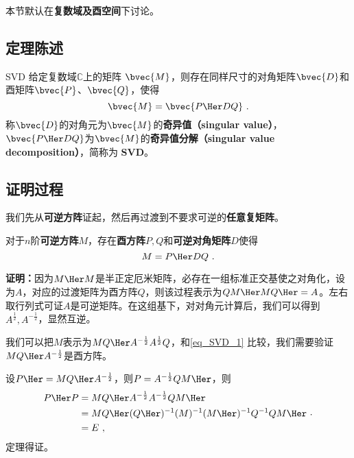 


本节默认在\textbf{复数域及酉空间}下讨论。
\subsection{定理陈述}
\begin{theorem}{SVD}
给定复数域$\mathbb{C}$上的矩阵 $\bvec{M}$，则存在同样尺寸的对角矩阵$\bvec{D}$和酉矩阵$\bvec{P}$、$\bvec{Q}$，使得
\begin{equation}
\bvec{M} = \bvec{P\Her DQ}~. 
\end{equation}
称$\bvec{D}$的对角元为$\bvec{M}$的\textbf{奇异值（singular value）}，$\bvec{P\Her DQ}$为$\bvec{M}$的\textbf{奇异值分解（singular value decomposition）}，简称为 \textbf{SVD}。
\end{theorem}


\subsection{证明过程}

我们先从\textbf{可逆方阵}证起，然后再过渡到不要求可逆的\textbf{任意复矩阵}。
\begin{theorem}{}\label{the_SVD_1}
对于$n$阶\textbf{可逆方阵}$M$，存在\textbf{酉方阵}$P,Q$和\textbf{可逆对角矩阵}$D$使得
\begin{equation}\label{eq_SVD_1}
M=P\Her DQ~.
\end{equation}

\end{theorem}
\textbf{证明：}因为$M\Her M$是半正定厄米矩阵，必存在一组标准正交基使之对角化，设为$A$，对应的过渡矩阵为酉方阵$Q$，则该过程表示为$QM\Her MQ\Her =A$。左右取行列式可证$A$是可逆矩阵。在这组基下，对对角元计算后，我们可以得到$A^{\frac{1}{2}},A^{-\frac{1}{2}}$，显然互逆。

我们可以把$M$表示为$MQ\Her A^{-\frac{1}{2}}A^{\frac{1}{2}}Q$，和\autoref{eq_SVD_1} 比较，我们需要验证$MQ\Her A^{-\frac{1}{2}}$是酉方阵。

设$P\Her =MQ\Her A^{-\frac{1}{2}}$，则$P=A^{-\frac{1}{2}}QM\Her $，则
\begin{equation}
\begin{aligned}
P\Her P&=MQ\Her A^{-\frac{1}{2}}A^{-\frac{1}{2}}QM\Her \\
&=MQ\Her (Q\Her )^{-1}(M)^{-1}(M\Her )^{-1}Q^{-1}QM\Her \\
&=E~,
\end{aligned}
~.
\end{equation}
定理得证。

